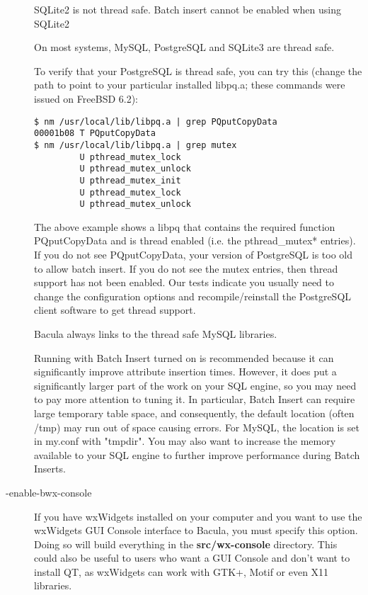 \begin{description}
   SQLite2 is not thread safe.  Batch insert cannot be enabled when using
   SQLite2

   On most systems, MySQL, PostgreSQL and SQLite3 are thread safe.

   To verify that your PostgreSQL is thread safe, you can try this
   (change the path to point to your particular installed libpq.a;
   these commands were issued on FreeBSD 6.2):

\begin{verbatim}
$ nm /usr/local/lib/libpq.a | grep PQputCopyData
00001b08 T PQputCopyData
$ nm /usr/local/lib/libpq.a | grep mutex
         U pthread_mutex_lock
         U pthread_mutex_unlock
         U pthread_mutex_init
         U pthread_mutex_lock
         U pthread_mutex_unlock
\end{verbatim}

   The above example shows a libpq that contains the required function
   PQputCopyData and is thread enabled (i.e. the pthread\_mutex* entries).
   If you do not see PQputCopyData, your version of PostgreSQL is too old
   to allow batch insert.  If you do not see the mutex entries, then thread
   support has not been enabled. Our tests indicate you usually need to
   change the configuration options and recompile/reinstall the PostgreSQL
   client software to get thread support.

   Bacula always links to the thread safe MySQL libraries.

   Running with Batch Insert turned on is recommended because it can
   significantly improve attribute insertion times. However, it does 
   put a significantly larger part of the work on your SQL engine, so
   you may need to pay more attention to tuning it. In particular,   
   Batch Insert can require large temporary table space, and consequently,
   the default location (often /tmp) may run out of space causing errors.
   For MySQL, the location is set in my.conf with "tmpdir".  You may also
   want to increase the memory available to your SQL engine to further
   improve performance during Batch Inserts.

\item [ {-}{\-}enable-bwx-console ]
   If you have wxWidgets installed on your computer and you want to use the
   wxWidgets GUI Console interface to Bacula, you must specify this option.
   Doing so will build everything in the {\bf src/wx-console} directory.
   This could also be useful to users who want a GUI Console and don't want
   to install QT, as wxWidgets can work with GTK+, Motif or even X11
   libraries.


\end{description}
